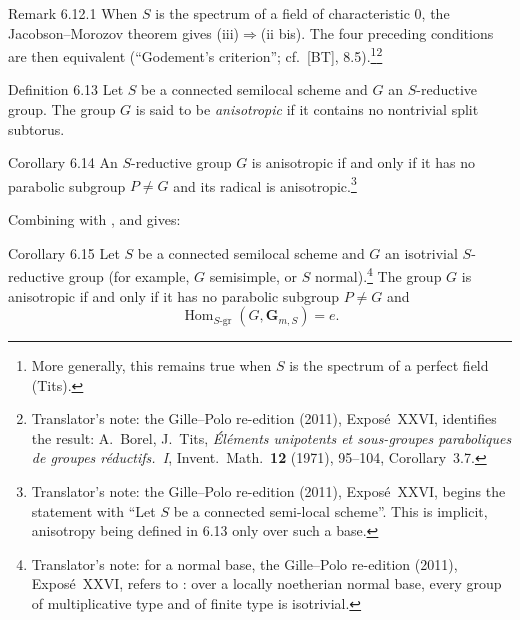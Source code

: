 \begin{sgastatement}{Remark 6.12.1}
When \(S\) is the spectrum of a field of characteristic \(0\), the
Jacobson--Morozov theorem gives
\textup{(iii)}\(\Rightarrow\)\textup{(ii bis)}.  The four preceding
conditions are then equivalent \textup{(``Godement's criterion'';
cf.\ \textup{[BT]}, 8.5)}.\footnote{More generally, this remains
true when \(S\) is the spectrum of a perfect field \textup{(Tits)}.}\footnote{Translator's note: the Gille--Polo re-edition (2011), Exposé~XXVI,
identifies the result: A.~Borel, J.~Tits, \textit{Éléments unipotents et
sous-groupes paraboliques de groupes réductifs.~I}, Invent.\ Math.\
\textbf{12} (1971), 95--104, Corollary~3.7.}
\end{sgastatement}

\begin{sgastatement}{Definition 6.13}
Let \(S\) be a connected semilocal scheme and \(G\) an
\(S\)-reductive group.  The group \(G\) is said to be
\emph{anisotropic} if it contains no nontrivial split subtorus.
\end{sgastatement}

\begin{sgastatement}{Corollary 6.14}
An \(S\)-reductive group \(G\) is anisotropic if and only if it has no
parabolic subgroup \(P\ne G\) and its radical is anisotropic.\footnote{Translator's note: the Gille--Polo re-edition (2011), Exposé~XXVI, begins
the statement with ``Let \(S\) be a connected semi-local scheme''. This is
implicit, anisotropy being defined in 6.13 only over such a base.}
\end{sgastatement}

Combining  with , and  gives:

\begin{sgastatement}{Corollary 6.15}
Let \(S\) be a connected semilocal scheme and \(G\) an isotrivial
\(S\)-reductive group \textup{(for example, \(G\) semisimple, or
\(S\) normal)}.\footnote{Translator's note: for a normal base, the Gille--Polo re-edition (2011),
Exposé~XXVI, refers to \SGARefLink{sga3:x:theorem:5-16}{Exposé X, 5.16}: over a locally noetherian normal base,
every group of multiplicative type and of finite type is isotrivial.}  The group \(G\) is anisotropic
if and only if it has no parabolic subgroup \(P\ne G\) and
\[
 \operatorname{Hom}_{S\text{-}\mathrm{gr}}
   (G,\mathbf G_{m,S})=e.
\]
\end{sgastatement}

